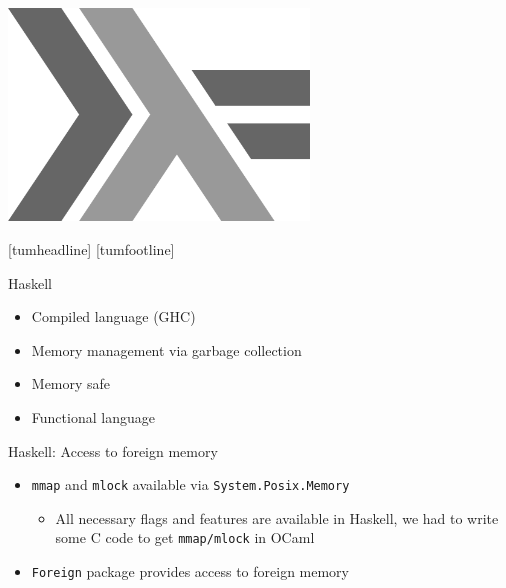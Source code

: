 \documentclass[NET,english,aspectratio=169,notitleframe]{tumbeamer}
\begin{document}


\begin{frame}{}
\centering\includegraphics[width=0.6\textwidth]{pics/haskell}
\end{frame}
[tumheadline]
[tumfootline]

\begin{frame}{Haskell}
\begin{itemize}
\item Compiled language (GHC)
\item Memory management via garbage collection
\item Memory safe
\item Functional language
\end{itemize}
\end{frame}


\begin{frame}{Haskell: Access to foreign memory}
\begin{itemize}
\item \texttt{mmap} and \texttt{mlock} available via \texttt{System.Posix.Memory}
\begin{itemize}
\item All necessary flags and features are available in Haskell, we had to write some C code to get \texttt{mmap/mlock} in OCaml
\end{itemize}
\vspace{1em}
\item \texttt{Foreign} package provides access to foreign memory
\end{itemize}
\end{frame}
\end{document}
